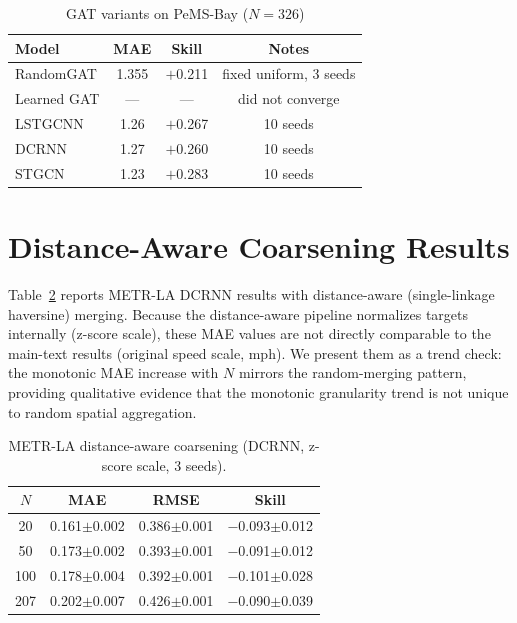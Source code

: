 \documentclass[sigconf]{acmart}
\begin{document}
\begin{table}[h]
\small
\centering
\caption{GAT variants on PeMS-Bay ($N = 326$)}
\label{tab:randomgat_app}
\begin{tabular}{lccc}
\toprule
Model & MAE & Skill & Notes \\
\midrule
RandomGAT    & 1.355 & $+$0.211 & fixed uniform, 3 seeds \\
Learned GAT  & --- & --- & did not converge \\
LSTGCNN      & 1.26 & $+$0.267 & 10 seeds \\
DCRNN        & 1.27 & $+$0.260 & 10 seeds \\
STGCN        & 1.23 & $+$0.283 & 10 seeds \\
\bottomrule
\end{tabular}
\end{table}

\section{Distance-Aware Coarsening Results}
\label{app:distance}

Table~\ref{tab:distance} reports METR-LA DCRNN results with distance-aware (single-linkage haversine) merging. Because the distance-aware pipeline normalizes targets internally (z-score scale), these MAE values are not directly comparable to the main-text results (original speed scale, mph). We present them as a trend check: the monotonic MAE increase with $N$ mirrors the random-merging pattern, providing qualitative evidence that the monotonic granularity trend is not unique to random spatial aggregation.

\begin{table}[H]
\small
\centering
\caption{METR-LA distance-aware coarsening (DCRNN, z-score scale, 3 seeds).}
\label{tab:distance}
\begin{tabular}{cccc}
\toprule
$N$ & MAE & RMSE & Skill \\
\midrule
20  & 0.161{\scriptsize$\pm$0.002} & 0.386{\scriptsize$\pm$0.001} & $-$0.093{\scriptsize$\pm$0.012} \\
50  & 0.173{\scriptsize$\pm$0.002} & 0.393{\scriptsize$\pm$0.001} & $-$0.091{\scriptsize$\pm$0.012} \\
100 & 0.178{\scriptsize$\pm$0.004} & 0.392{\scriptsize$\pm$0.001} & $-$0.101{\scriptsize$\pm$0.028} \\
207 & 0.202{\scriptsize$\pm$0.007} & 0.426{\scriptsize$\pm$0.001} & $-$0.090{\scriptsize$\pm$0.039} \\
\bottomrule
\end{tabular}
\end{table}
\end{document}
